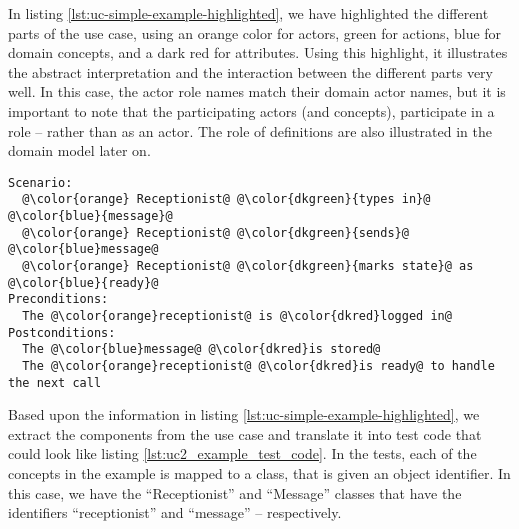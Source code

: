 \noindent In listing \ref{lst:uc-simple-example-highlighted}, we have highlighted the different parts of the use case, using an orange color for actors, green for actions, blue for domain concepts, and a dark red for attributes. Using this highlight, it illustrates the abstract interpretation and the interaction between the different parts very well. In this case, the actor role names match their domain actor names, but it is important to note that the participating actors (and concepts), participate in a role -- rather than as an actor. The role of definitions are also illustrated in the domain model later on.
\begin{lstlisting}[frame=single,style=usecase, caption=Use case example with its different parts highlighted, label=lst:uc-simple-example-highlighted]
Scenario:
  @\color{orange} Receptionist@ @\color{dkgreen}{types in}@ @\color{blue}{message}@
  @\color{orange} Receptionist@ @\color{dkgreen}{sends}@ @\color{blue}message@
  @\color{orange} Receptionist@ @\color{dkgreen}{marks state}@ as @\color{blue}{ready}@
Preconditions:
  The @\color{orange}receptionist@ is @\color{dkred}logged in@
Postconditions:
  The @\color{blue}message@ @\color{dkred}is stored@
  The @\color{orange}receptionist@ @\color{dkred}is ready@ to handle the next call
\end{lstlisting} 
Based upon the information in listing \ref{lst:uc-simple-example-highlighted}, we extract the components from the use case and translate it into test code that could look like listing \ref{lst:uc2_example_test_code}. In the tests, each of the concepts in the example is mapped to a class, that is given an object identifier. In this case, we have the ``Receptionist'' and ``Message'' classes that have the identifiers ``receptionist'' and ``message'' -- respectively.\medskip

